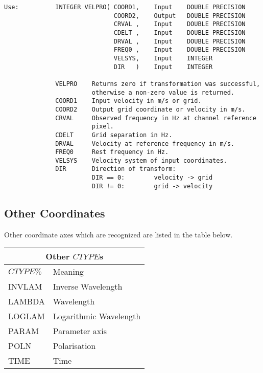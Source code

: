\begin{verbatim}
Use:          INTEGER VELPRO( COORD1,    Input    DOUBLE PRECISION
                              COORD2,    Output   DOUBLE PRECISION
                              CRVAL ,    Input    DOUBLE PRECISION
                              CDELT ,    Input    DOUBLE PRECISION
                              DRVAL ,    Input    DOUBLE PRECISION
                              FREQ0 ,    Input    DOUBLE PRECISION
                              VELSYS,    Input    INTEGER
                              DIR   )    Input    INTEGER

              VELPRO    Returns zero if transformation was successful,
                        otherwise a non-zero value is returned.
              COORD1    Input velocity in m/s or grid.
              COORD2    Output grid coordinate or velocity in m/s.
              CRVAL     Observed frequency in Hz at channel reference
                        pixel.
              CDELT     Grid separation in Hz.
              DRVAL     Velocity at reference frequency in m/s.
              FREQ0     Rest frequency in Hz.
              VELSYS    Velocity system of input coordinates.
              DIR       Direction of transform:
                        DIR == 0:        velocity -> grid
                        DIR != 0:        grid -> velocity
\end{verbatim}

\subsection{Other Coordinates}

Other coordinate axes which are recognized are listed in the table
below.

\begin{center}
\begin{tabular}{|l|l|}
\hline
\multicolumn{2}{|c|}{Other $CTYPE$s}\\
\hline
$CTYPE\%$&Meaning\\
\hline
INVLAM&Inverse Wavelength\\
LAMBDA&Wavelength\\
LOGLAM&Logarithmic Wavelength\\
PARAM &Parameter axis\\
POLN  &Polarisation\\
TIME  &Time\\
\hline
\end{tabular}
\end{center}

